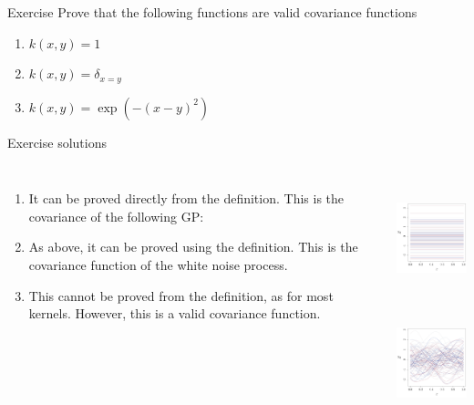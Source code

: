 \documentclass{beamer}
\begin{document}
\begin{frame}{}
\begin{exampleblock}{Exercise}
Prove that the following functions are valid covariance functions
\begin{enumerate}
	\item $k(x,y) = 1$
	\item $k(x,y) = \delta_{x=y}$
	\item $k(x,y) = \exp(-(x-y)^2)$
\end{enumerate}	
\end{exampleblock}
\end{frame}

\begin{frame}{}
\begin{exampleblock}{Exercise solutions}
\begin{columns}[c]
\column{7cm}
\begin{enumerate}
	\item It can be proved directly from the definition. This is the covariance of the following GP: \vspace{5mm}
	\item As above, it can be proved using the definition. This is the covariance function of the white noise process.\vspace{5mm}
	\item This cannot be proved from the definition, as for most kernels. However, this is a valid covariance function. 
\end{enumerate}	
\column{4cm}
\includegraphics[height=3.5cm]{figures/R/GPR_simCst}%
\\
\vspace{7mm}
\includegraphics[height=3.5cm]{figures/R/GPR_simGauss}
\end{columns}
\end{exampleblock}
\end{frame}
\end{document}
